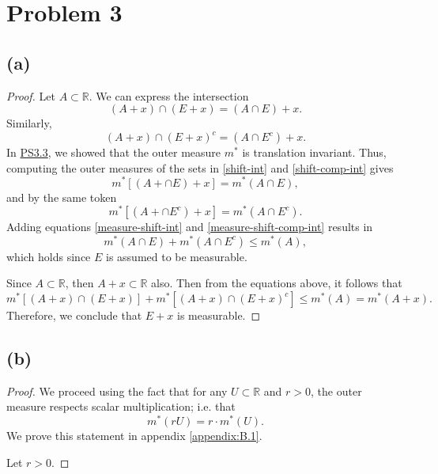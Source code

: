\documentclass{article}
\begin{document}
\section*{Problem 3}
\subsection*{(a)}
\begin{proof}
	Let $A \subset \mathbb{R}$. We can express the intersection
	\begin{equation}\label{shift-int}
		(A+x) \cap (E+x) = (A\cap E) + x.
	\end{equation}
	Similarly,
	\begin{equation}\label{shift-comp-int}
		(A+x) \cap (E+x)^c = (A\cap E^c) + x.
	\end{equation}
	In \href{https://github.com/ovega14/FunctionalAnalysis_solutions/blob/main/PS3/18.102_ps3.pdf}{PS3.3}, we showed that the outer measure $m^*$ is translation invariant. Thus, computing the outer measures of the sets in \eqref{shift-int} and \eqref{shift-comp-int} gives
	\begin{equation}\label{measure-shift-int}
		m^*\left[(A+\cap E) + x\right] = m^*(A\cap E),
	\end{equation}
	and by the same token
	\begin{equation}\label{measure-shift-comp-int}
		m^*\left[(A+\cap E^c) + x\right] = m^*(A\cap E^c).
	\end{equation}
	Adding equations \eqref{measure-shift-int} and \eqref{measure-shift-comp-int} results in 
	\begin{equation}
		m^*(A\cap E) + m^*(A\cap E^c) \leq m^*(A),
	\end{equation}
	which holds since $E$ is assumed to be measurable.
	
	Since $A \subset \mathbb{R}$, then $A + x \subset \mathbb{R}$ also. Then from the equations above, it follows that
	\begin{equation}
		m^*\left[(A+x) \cap (E+x)\right] + m^*\left[(A+x) \cap (E+x)^c\right] \leq m^*(A) = m^*(A+x).
	\end{equation}
	Therefore, we conclude that $E+x$ is measurable. 
\end{proof}

\subsection*{(b)}
\begin{proof}
	We proceed using the fact that for any $U \subset \mathbb{R}$ and $r > 0$, the outer measure respects scalar multiplication; i.e. that 
	\begin{equation}
		m^*(rU) = r \cdot m^*(U).
	\end{equation}
	We prove this statement in appendix \ref{appendix:B.1}. 
	
	Let $r > 0$. 
\end{proof}
\end{document}
